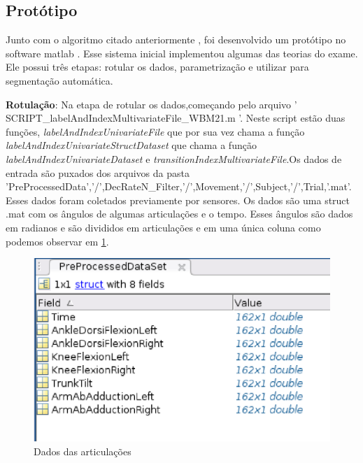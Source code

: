   \subsection{Protótipo}
  \label{Sec:protótipo}
    Junto com o algoritmo citado anteriormente \cite{roberto}, foi
  desenvolvido um protótipo no software matlab \cite{matlab}. Esse sistema inicial
  implementou algumas das teorias do exame. Ele possui três etapas: rotular os dados,
  parametrização e utilizar para segmentação automática.
  \begin{itemize}

  \begin{sloppypar}

  \item \textbf{Rotulação}: Na etapa de rotular os dados,começando pelo arquivo
  ' SCRIPT\_labelAndIndexMultivariateFile\_WBM21.m '. Neste script estão duas funções,
  \textit{labelAndIndexUnivariateFile} que por sua vez chama a função
  \textit{labelAndIndexUnivariateStructDataset} que chama a função \textit{labelAndIndexUnivariateDataset}
  e \textit{transitionIndexMultivariateFile}.Os dados de entrada são puxados dos arquivos da pasta
  'PreProcessedData','/',DecRateN\_Filter,'/',Movement,'/',Subject,'/',Trial,'.mat'.
  Esses dados foram coletados previamente por sensores. Os dados são uma struct .mat
  com  os ângulos de algumas articulações e o tempo. Esses ângulos são dados em radianos
   e são divididos em articulações e em uma única coluna como podemos observar em \ref{structMatlab}.

  \begin{figure}[!h]
  \centering
  \includegraphics [keepaspectratio=true,scale=0.60]{figuras/structMatlab.eps}
  \caption{Dados das articulações}
  \label{structMatlab}
  \end{figure}


\end{sloppypar}
\end{itemize}
